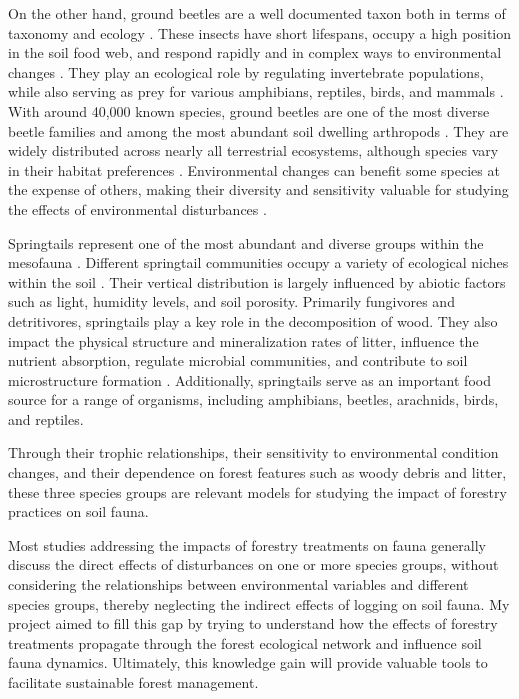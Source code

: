 On the other hand, ground beetles are a well documented taxon both in terms of taxonomy and ecology \citep{loveiEcologyBehaviorGround1996}. 
These insects have short lifespans, occupy a high position in the soil food web, and respond rapidly and in complex ways to environmental changes \citep{loveiEcologyBehaviorGround1996}. 
They play an ecological role by regulating invertebrate populations, while also serving as prey for various amphibians, reptiles, birds, and mammals \citep{loveiEcologyBehaviorGround1996}. 
With around 40,000 known species, ground beetles are one of the most diverse beetle families and among the most abundant soil dwelling arthropods \citep{Erwin1985taxonpulse,loveiEcologyBehaviorGround1996,Rochefort2006GroundBeetle}. 
They are widely distributed across nearly all terrestrial ecosystems, although species vary in their habitat preferences  \citep{loveiEcologyBehaviorGround1996,kotzeFortyYearsCarabid2011a,Larochelle2003naturalhistory}. 
Environmental changes can benefit some species at the expense of others, making their diversity and sensitivity valuable for studying the effects of environmental disturbances \citep{Rainio2003Groundbeetles}. 

Springtails represent one of the most abundant and diverse groups within the mesofauna \citep{rusekBiodiversityCollembolaTheir1998}. 
Different springtail communities occupy a variety of ecological niches within the soil \citep{pongeVerticalDistributionCollembola2000}.
Their vertical distribution is largely influenced by abiotic factors such as light, humidity levels, and soil porosity. 
Primarily fungivores and detritivores, springtails play a key role in the decomposition of wood. 
They also impact the physical structure and mineralization rates of litter, influence the nutrient absorption, 
regulate microbial communities, and contribute to soil microstructure formation \citep{Petersen1982comparativeanalysis,Neher2012Linkinginvertebrate,Maass2015Functionalrole,Potapov2016Connectingtaxonomy}. 
Additionally, springtails serve as an important food source for a range of organisms, including amphibians, beetles, arachnids, birds, and reptiles.

Through their trophic relationships, their sensitivity to environmental condition changes, and their dependence on forest features such as woody debris and litter, 
these three species groups are relevant models for studying the impact of forestry practices on soil fauna.

Most studies addressing the impacts of forestry treatments on fauna generally discuss the direct effects of disturbances on one or more species groups, 
without considering the relationships between environmental variables and different species groups, thereby neglecting the indirect effects of logging on soil fauna. 
My project aimed to fill this gap by trying to understand how the effects of forestry treatments propagate through the forest ecological network and influence soil fauna dynamics. 
Ultimately, this knowledge gain will provide valuable tools to facilitate sustainable forest management.

